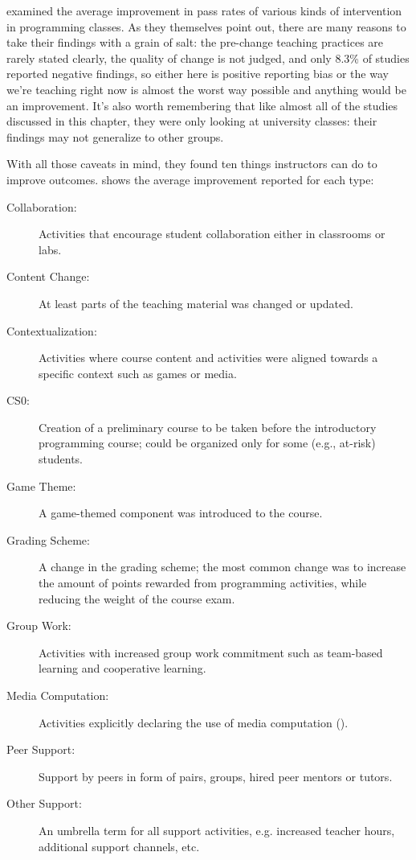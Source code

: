 \cite{Viha2014} examined the average improvement in pass rates of
various kinds of intervention in programming classes.  As they
themselves point out, there are many reasons to take their findings
with a grain of salt: the pre-change teaching practices are rarely
stated clearly, the quality of change is not judged, and only 8.3\% of
studies reported negative findings, so either here is positive
reporting bias or the way we're teaching right now is almost the worst
way possible and anything would be an improvement.  It's also worth
remembering that like almost all of the studies discussed in this
chapter, they were only looking at university classes: their findings
may not generalize to other groups.

With all those caveats in mind, they found ten things instructors can
do to improve outcomes.   shows the
average improvement reported for each type:

\begin{description}

\item[Collaboration:] %
  Activities that encourage student collaboration either in classrooms
  or labs.

\item[Content Change:] %
  At least parts of the teaching material was changed or updated.

\item[Contextualization:] %
  Activities where course content and activities were aligned towards
  a specific context such as games or media.

\item[CS0:] %
  Creation of a preliminary course to be taken before the introductory
  programming course; could be organized only for some (e.g., at-risk)
  students.

\item[Game Theme:] %
  A game-themed component was introduced to the course.

\item[Grading Scheme:] %
  A change in the grading scheme; the most common change was to
  increase the amount of points rewarded from programming activities,
  while reducing the weight of the course exam.

\item[Group Work:] %
  Activities with increased group work commitment such as team-based
  learning and cooperative learning.

\item[Media Computation:] %
  Activities explicitly declaring the use of media computation
  ().

\item[Peer Support:] %
  Support by peers in form of pairs, groups, hired peer mentors or
  tutors.

\item[Other Support:] %
  An umbrella term for all support activities, e.g. increased teacher
  hours, additional support channels, etc.

\end{description}

